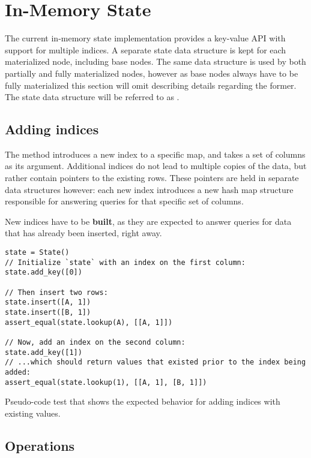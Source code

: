 \section{In-Memory State}\label{sec:in-memory-state}
The current in-memory state implementation provides a key-value API with support
for multiple indices. A separate state data structure is kept for each
materialized node, including base nodes. The same data structure is used by both
partially and fully materialized nodes, however as base nodes always have to be
fully materialized this section will omit describing details regarding the
former. The state data structure will be referred to as .

\subsection{Adding indices}
The  method introduces a new index to a specific  map,
and takes a set of columns as its argument. Additional indices do not lead to
multiple copies of the data, but rather contain pointers to the existing rows.
These pointers are held in separate data structures however: each new index
introduces a new hash map structure responsible for answering queries for that
specific set of columns.

New indices have to be \textbf{built}, as they are expected to answer queries
for data that has already been inserted, right away.

\begin{listing}[H]
  \begin{verbatim}
state = State()
// Initialize `state` with an index on the first column:
state.add_key([0])

// Then insert two rows:
state.insert([A, 1])
state.insert([B, 1])
assert_equal(state.lookup(A), [[A, 1]])

// Now, add an index on the second column:
state.add_key([1])
// ...which should return values that existed prior to the index being added:
assert_equal(state.lookup(1), [[A, 1], [B, 1]])
  \end{verbatim}

  \caption{Pseudo-code test that shows the expected behavior for adding indices
  with existing values.}\label{lst:existing-index}
\end{listing}

\subsection{Operations}

